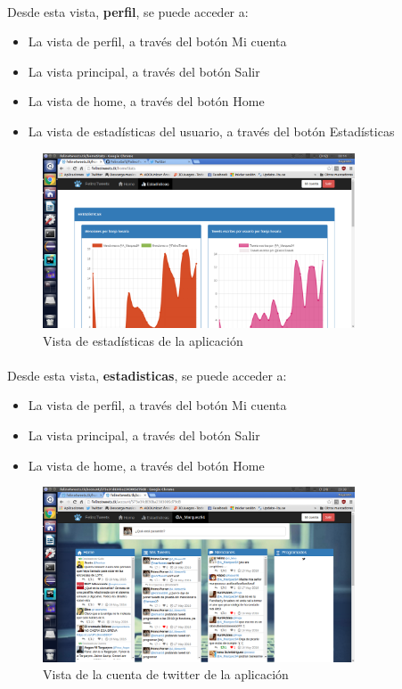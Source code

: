 \documentclass[a4paper]{article}
\begin{document}
\paragraph{} Desde esta vista, \textbf{perfil}, se puede acceder a:
\begin{itemize}
	\item La vista de perfil, a través del botón Mi cuenta
	\item La vista principal, a través del botón Salir
	\item La vista de home, a través del botón Home
	\item La vista de estadísticas del usuario, a través del botón Estadísticas
\end{itemize}
\begin{figure}[H]
	\centering
	\includegraphics[width=350px]{img/estadisticas.png}
	\caption{Vista de estadísticas de la aplicación}
	\label{fig:diagarq}
\end{figure}
\paragraph{} Desde esta vista, \textbf{estadisticas}, se puede acceder a:
\begin{itemize}
	\item La vista de perfil, a través del botón Mi cuenta
	\item La vista principal, a través del botón Salir
	\item La vista de home, a través del botón Home
\end{itemize}
\begin{figure}[H]
	\centering
	\includegraphics[width=350px]{img/account.png}
	\caption{Vista de la cuenta de twitter de la aplicación}
	\label{fig:diagarq}
\end{figure}
\end{document}
